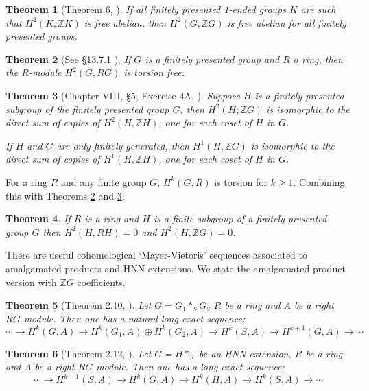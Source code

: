 \documentclass[12pt]{article}
\newtheorem{theorem}{Theorem}[subsection]
\begin{document}
\begin{theorem} [Theorem 6, \cite{M87}]\label{Equival1}
If all finitely presented 1-ended groups $K$ are such that $H^2(K,\mathbb ZK)$ is free abelian, then $H^2(G,\mathbb ZG)$ is free abelian for all finitely presented groups.
\end{theorem} 


\begin{theorem} [See \S13.7.1 \cite{G}] \label{TorF} 
If $G$ is a finitely presented group and $R$ a ring, then the $R$-module $H^2(G,RG)$ is torsion free. 
\end{theorem}


\begin{theorem}[Chapter VIII, \S5, Exercise 4A,  \cite{Br82}] \label{FreeS} 
Suppose $H$ is a finitely presented subgroup of the finitely presented group $G$, then $H^2(H; \mathbb ZG)$ is isomorphic to the direct sum of copies of $H^2(H,\mathbb ZH)$, one for each coset of $H$ in $G$.

If $H$ and $G$ are only finitely generated, then $H^1(H, \mathbb ZG)$ is isomorphic to the direct sum of copies of $H^1(H,\mathbb ZH)$, one for each coset of $H$ in $G$.
\end{theorem}


For a ring $R$ and any finite group $G$, $H^k(G,R)$ is torsion for $k\geq 1$. Combining this with Theorems \ref{TorF} and \ref{FreeS}:

\begin{theorem} \label{H20} 
If $R$ is a ring and $H$ is a finite subgroup of a finitely presented group $G$ then  $H^2(H,RH)=0$ and $H^2(H,\mathbb ZG)=0$.
\end{theorem}

There are useful cohomological `Mayer-Vietoris' sequences associated to amalgamated products and HNN extensions. We state the amalgamated product version with $\mathbb ZG$ coefficients. 

\begin{theorem} [Theorem 2.10, \cite{Bieri76}] \label{AmalH2}
Let $G = G_1 \ast_S G_2$ $R$ be a ring and $A$ be a right $RG$ module. Then one has a natural long exact sequence:
$$\cdots \to H^k(G,A)\to H^k(G_1,A)\oplus H^k(G_2,A)\to H^k(S, A)\to H^{k+1}(G,A)\to\cdots$$
\end{theorem}

\begin{theorem} [Theorem 2.12, \cite{Bieri76}] \label{HNNH2} 
Let $G = H \ast_S$ be an HNN extension, $R$ be a ring and $A$ be a right $RG$ module. Then one has a long exact sequence:
$$\cdots \to H^{k-1}(S,A)\to H^k(G,A)\to H^k(H,A)\to H^k(S, A)\to\cdots$$
\end{theorem}
 
\end{document}

